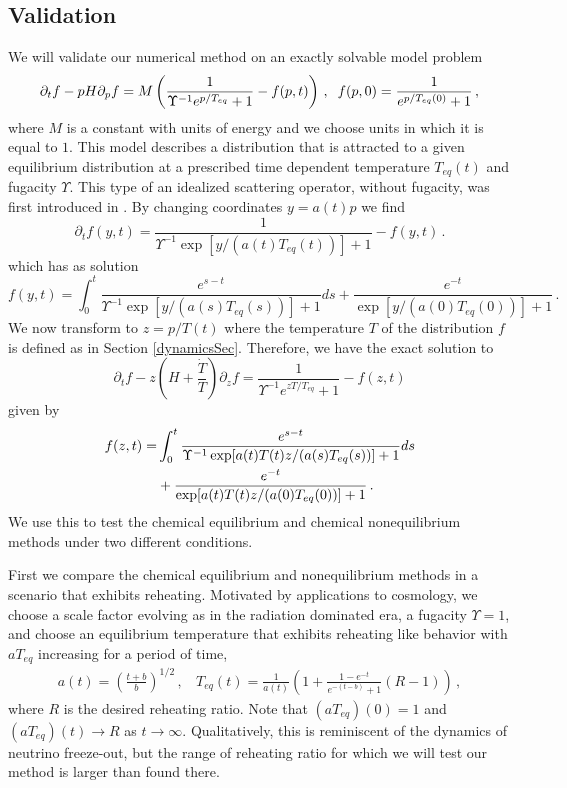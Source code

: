 \subsection{Validation}\label{validation}
We will validate our numerical method on an exactly solvable model problem
\begin{equation}\label{toyEq}
\partial_t f-pH \partial_p f=M\left(\frac{1}{\Upsilon^{-1}e^{p/T_{eq}}+1}-f(p,t)\right)\,, \hspace{2mm} f(p,0)=\frac{1}{e^{p/T_{eq}(0)}+1}\,,
\end{equation}
where $M$ is a constant with units of energy and we choose units in which it is equal to $1$. This model describes a distribution that is attracted to a given equilibrium distribution at a prescribed time dependent temperature $T_{eq}(t)$ and fugacity $\Upsilon$. This type of an idealized scattering operator, without fugacity, was first introduced in \cite{Anderson:1974nyl}. By changing coordinates $y=a(t)p$ we find
\begin{equation}\label{freeStreamToy}
\partial_tf(y,t)=\frac{1}{\Upsilon^{-1}\exp[y/(a(t)T_{eq}(t))]+1}-f(y,t)\,.
\end{equation}
 which has as solution
\begin{equation}\label{exactSol}
f(y,t)=\int_0^t\frac{e^{s-t}}{\Upsilon^{-1}\exp[y/(a(s)T_{eq}(s))]+1}ds+\frac{e^{-t}}{\exp[y/(a(0)T_{eq}(0))]+1}\,.
\end{equation}
We now transform to $z=p/T(t)$ where the temperature $T$ of the distribution $f$ is defined as in Section \ref{dynamicsSec}.  Therefore, we have the exact solution to
\begin{equation}\label{kEqToy}
\partial_tf-z\left(H+\frac{\dot{T}}{T}\right)\partial_zf=\frac{1}{\Upsilon^{-1}e^{zT/T_{eq}}+1}-f(z,t)
\end{equation}
given by
\begin{align}
f(z,t)=&\int_0^t\frac{e^{s-t}}{\Upsilon^{-1}\exp[a(t)T(t)z/(a(s)T_{eq}(s))]+1}ds\\
&+\frac{e^{-t}}{\exp[a(t)T(t)z/(a(0)T_{eq}(0))]+1}\,.\notag
\end{align}
We use this to test the chemical equilibrium and chemical nonequilibrium methods under two different conditions. 

First we compare the chemical equilibrium and nonequilibrium methods in a scenario that exhibits reheating.  Motivated by applications to cosmology, we choose a scale factor evolving as in the radiation dominated era, a fugacity $\Upsilon=1$, and choose an equilibrium temperature that exhibits reheating like behavior with $aT_{eq}$ increasing for a period of time,
\begin{align}\label{aTDef}
a(t)=\left(\frac{t+b}{b}\right)^{1/2}\,,\ \  \ \
T_{eq}(t)=\frac{1}{a(t)}\left(1+\frac{1-e^{-t}}{e^{-(t-b)}+1}(R-1)\right)\,,
\end{align}
where $R$ is the desired reheating ratio. Note that $(aT_{eq})(0)=1$ and $(aT_{eq})(t)\rightarrow R$ as $t\rightarrow\infty$. Qualitatively, this is reminiscent of the dynamics of neutrino freeze-out, but the range of reheating ratio for which we will test our method is larger than found there.

